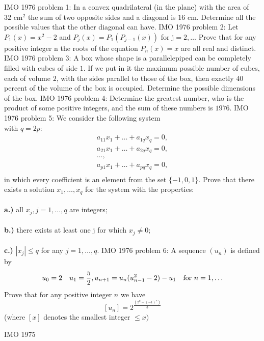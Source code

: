 IMO 1976 problem 1:  In a convex quadrilateral (in the plane) with the area of $32 \text{ cm}^2$ the sum of two opposite sides and a diagonal is $16 \text{ cm}$. Determine all the possible values that the other diagonal can have. 
IMO 1976 problem 2:  Let $P_1(x)=x^2-2$ and $P_j(x)=P_1(P_{j-1}(x))$ for j$=2,\ldots$ Prove that for any positive integer n the roots of the equation $P_n(x)=x$ are all real and distinct. 
IMO 1976 problem 3:  A box whose shape is a parallelepiped can be completely filled with cubes of side $1.$ If we put in it the maximum possible number of cubes, each of volume $2$, with the sides parallel to those of the box, then exactly $40$ percent of the volume of the box is occupied. Determine the possible dimensions of the box. 
IMO 1976 problem 4:  Determine the greatest number, who is the product of some positive integers, and the sum of these numbers is $1976.$ 
IMO 1976 problem 5:  We consider the following system \\
with $q=2p$:
\[
\begin{matrix} a_{11}x_1+\ldots+a_{1q}x_q=0,\\ a_{21}x_1+\ldots+a_{2q}x_q=0,\\ \ldots ,\\ a_{p1}x_1+\ldots+a_{pq}x_q=0,\\ \end{matrix}
\]
in which every coefficient is an element from the set $\{-1,0,1\}$$.$ Prove that there exists a solution $x_1, \ldots,x_q$ for the system with the properties: \\\\
\textbf{a.)} all $x_j, j=1,\ldots,q$ are integers$;$ \\\\
\textbf{b.)} there exists at least one j for which $x_j \neq 0;$ \\\\
\textbf{c.)} $|x_j| \leq q$ for any $j=1, \ldots ,q.$ 
IMO 1976 problem 6:  A sequence $(u_n)$ is defined by
\[ u_0=2 \quad u_1=\frac{5}{2}, u_{n+1}=u_n(u_{n-1}^2-2)-u_1 \quad \textnormal{for  } n=1,\ldots \]
Prove that for any positive integer $n$ we have
\[ [u_n]=2^{\frac{(2^n-(-1)^n)}{3}} \]
(where $[x]$ denotes the smallest integer $\leq x)$ 

IMO 1975 

